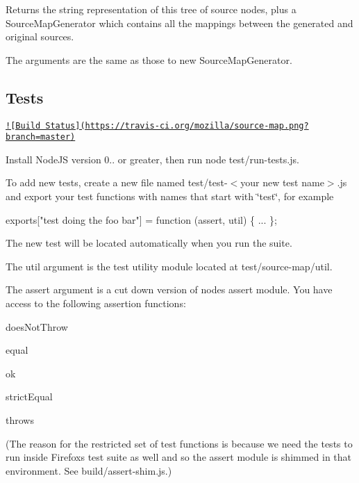 Returns the string representation of this tree of source nodes, plus a Source\+Map\+Generator which contains all the mappings between the generated and original sources.

The arguments are the same as those to {\ttfamily new Source\+Map\+Generator}.

\subsection*{Tests}

\href{https://travis-ci.org/mozilla/source-map}{\tt !\mbox{[}Build Status\mbox{]}(https\+://travis-\/ci.\+org/mozilla/source-\/map.\+png?branch=master)}

Install Node\+J\+S version 0.. or greater, then run {\ttfamily node test/run-\/tests.\+js}.

To add new tests, create a new file named {\ttfamily test/test-\/$<$your new test name$>$.js} and export your test functions with names that start with \char`\"{}test\char`\"{}, for example


\begin{DoxyCode}
exports[\textcolor{stringliteral}{"test doing the foo bar"}] = \textcolor{keyword}{function} (assert, util) \{
  ...
\};
\end{DoxyCode}


The new test will be located automatically when you run the suite.

The {\ttfamily util} argument is the test utility module located at {\ttfamily test/source-\/map/util}.

The {\ttfamily assert} argument is a cut down version of node\textquotesingle{}s assert module. You have access to the following assertion functions\+:


\begin{DoxyItemize}
\item {\ttfamily does\+Not\+Throw}
\item {\ttfamily equal}
\item {\ttfamily ok}
\item {\ttfamily strict\+Equal}
\item {\ttfamily throws}
\end{DoxyItemize}

(The reason for the restricted set of test functions is because we need the tests to run inside Firefox\textquotesingle{}s test suite as well and so the assert module is shimmed in that environment. See {\ttfamily build/assert-\/shim.\+js}.) 